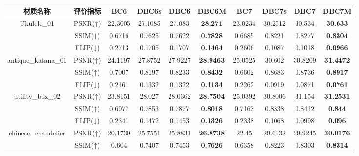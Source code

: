 \begin{table*}[htbp]
{    %
\begin{tabular}{cccccccccc}
    \toprule
    材质名称   & 评价指标 & BC6 & DBC6s & DBC6 & DBC6M & BC7 & DBC7s & DBC7 & DBC7M \\
    \midrule
    \multirow{3}{*}{Ukulele\_01}         &PSNR(↑) & 22.3005 & 27.1085 & 27.083 & \textbf{28.271} & 23.0234 & 30.2512 & 30.534 & \textbf{30.633} \\
                                         &SSIM(↑) & 0.6716 & 0.7625 & 0.7622 & \textbf{0.7828} & 0.6685 & 0.8221 & 0.8277 & \textbf{0.8304} \\
                                         &FLIP(↓) & 0.2713 & 0.1705 & 0.1707 & \textbf{0.1464} & 0.2606 & 0.1087 & 0.1018 & \textbf{0.0966} \\
    \midrule
    \multirow{3}{*}{antique\_katana\_01} &PSNR(↑) & 24.1197 & 27.8752 & 27.9227 & \textbf{28.9463} & 25.0525 & 30.602 & 30.8209 & \textbf{31.4472} \\
                                         &SSIM(↑) & 0.7007 & 0.8197 & 0.8233 & \textbf{0.8432} & 0.6602 & 0.8683 & 0.8736 & \textbf{0.8917} \\
                                         &FLIP(↓) & 0.2161 & 0.1332 & 0.1322 & \textbf{0.1134} & 0.2262 & 0.0919 & 0.0871 & \textbf{0.0761} \\
    \midrule
    \multirow{3}{*}{utility\_box\_02}    &PSNR(↑) & 23.8151 & 28.027 & 28.0362 & \textbf{28.7504} & 25.0392 & 30.8006 & 31.154 & \textbf{31.2531} \\
                                         &SSIM(↑) & 0.6977 & 0.7853 & 0.7877 & \textbf{0.8018} & 0.7163 & 0.8338 & 0.8412 & \textbf{0.844} \\
                                         &FLIP(↓) & 0.2341 & 0.1472 & 0.1453 & \textbf{0.1326} & 0.2338 & 0.1068 & 0.0998 & \textbf{0.096} \\
    \midrule
    \multirow{3}{*}{chinese\_chandelier} &PSNR(↑) & 20.1739 & 25.7551 & 25.8831 & \textbf{26.8738} & 22.45 & 29.6132 & 29.9245 & \textbf{30.0176} \\
                                         &SSIM(↑) & 0.604 & 0.7407 & 0.7453 & \textbf{0.7626} & 0.6358 & 0.8223 & 0.8303 & \textbf{0.8314} \\

\end{tabular}}
\end{table*}
